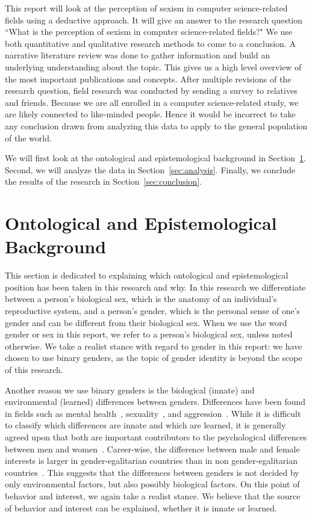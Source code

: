 \documentclass[twocolumn, switch]{article}
\begin{document}
    This report will look at the perception of sexism in computer science-related fields using a deductive approach.
    It will give an answer to the research question ``What is the perception of sexism in computer science-related fields?"
    We use both quantitative and qualitative research methods to come to a conclusion.
    A narrative literature review was done to gather information and build an underlying understanding about the topic.
    This gives us a high level overview of the most important publications and concepts.
    After multiple revisions of the research question, field research was conducted by sending a survey to relatives and friends.
    Because we are all enrolled in a computer science-related study, we are likely connected to like-minded people.
    Hence it would be incorrect to take any conclusion drawn from analyzing this data to apply to the general population of the world.
    
    We will first look at the ontological and epistemological background in Section~\ref{sec:ontological}.
    Second, we will analyze the data in Section~\ref{sec:analysis}.
    Finally, we conclude the results of the research in Section~\ref{sec:conclusion}.
    
    \section{Ontological and Epistemological Background} \label{sec:ontological}
    This section is dedicated to explaining which ontological and epistemological position has been taken in this research and why.
    In this research we differentiate between a person's biological sex, which is the anatomy of an individual's reproductive system, and a person's gender, which is the personal sense of one's gender and can be different from their biological sex.
    When we use the word gender or sex in this report, we refer to a person's biological sex, unless noted otherwise.
    We take a realist stance with regard to gender in this report: we have chosen to use binary genders, as the topic of gender identity is beyond the scope of this research. 
    
    Another reason we use binary genders is the biological (innate) and environmental (learned) differences between genders.
    Differences have been found in fields such as mental health~\cite{afifi2007gender}, sexuality~\cite{oliver1993gender}, and aggression~\cite{del2015gender}.
    While it is difficult to classify which differences are innate and which are learned, it is generally agreed upon that both are important contributors to the psychological differences between men and women~\cite{martin2010masculinity}.
    Career-wise, the difference between male and female interests is larger in gender-egalitarian countries than in non gender-egalitarian countries~\cite{lippa2010gender}.
    This suggests that the differences between genders is not decided by only environmental factors, but also possibly biological factors.
    On this point of behavior and interest, we again take a realist stance.
    We believe that the source of behavior and interest can be explained, whether it is innate or learned.
    
\end{document}
